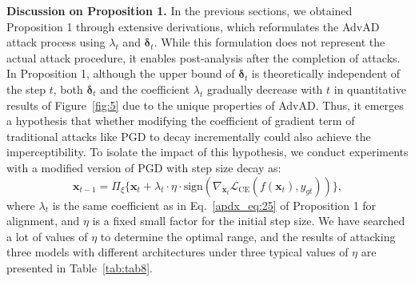 \documentclass{article}
\begin{document}
\textbf{Discussion on Proposition 1.} In the previous sections, we obtained Proposition 1 through extensive derivations, which reformulates the AdvAD attack process using $\lambda_t$ and $\boldsymbol{\delta}_t$. While this formulation does not represent the actual attack procedure, it enables post-analysis after the completion of attacks. In Proposition 1, although the upper bound of $\boldsymbol{\delta}_t$ is theoretically independent of the step $t$, both $\boldsymbol{\delta}_t$ and the coefficient $\lambda_t$ gradually decrease with $t$ in quantitative results of Figure~\ref{fig:5} due to the unique properties of AdvAD. Thus, it emerges a hypothesis that whether modifying the coefficient of gradient term of traditional attacks like PGD to decay incrementally could also achieve the imperceptibility. To isolate the impact of this hypothesis, we conduct experiments with a modified version of PGD with step size decay as:
\begin{equation}
    \tag{53}
    \label{apdx_eq:39}
    \boldsymbol{x}_{t-1} = \Pi_\xi\{\boldsymbol{x}_{t} + \lambda_t \cdot \eta \cdot \text{sign}(\nabla_{\boldsymbol{x}_t}\mathcal L_\text{CE}(f(\boldsymbol{x}_t), y_{gt}))\},
\end{equation}
where $\lambda_t$ is the same coefficient as in Eq.~\eqref{apdx_eq:25} of Proposition 1 for alignment, and $\eta$ is a fixed small factor for the initial step size.  We have searched a lot of values of $\eta$ to determine the optimal range, and the results of attacking three models with different architectures under three typical values of $\eta$ are presented in Table~\ref{tab:tab8}.
\end{document}
